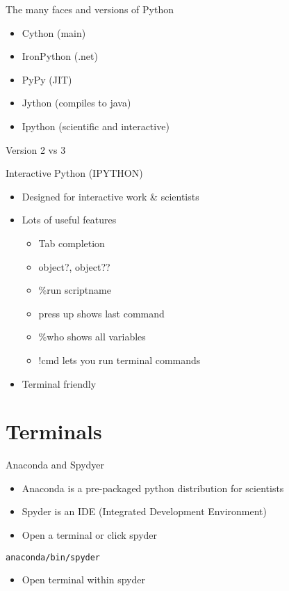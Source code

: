 \documentclass[presentation]{beamer}
\begin{document}
\begin{frame}[label=sec-2-0-5]{The many faces and versions of Python}
\begin{itemize}
\item Cython (main)
\item IronPython (.net)
\item PyPy (JIT)
\item Jython (compiles to java)
\item Ipython (scientific and interactive)
\end{itemize}
\end{frame}

\begin{frame}[label=sec-2-0-6]{Version 2 vs 3}
\end{frame}

\begin{frame}[label=sec-2-0-7]{Interactive Python (IPYTHON)}
\begin{itemize}
\item Designed for interactive work \& scientists
\item Lots of useful features
\begin{itemize}
\item Tab completion
\item object?, object??
\item \%run scriptname
\item press up shows last command
\item \%who shows all variables
\item !cmd lets you run terminal commands
\end{itemize}
\item Terminal friendly
\end{itemize}
\end{frame}


\section{Terminals}
\label{sec-3}

\begin{frame}[fragile,label=sec-3-0-1]{Anaconda and Spydyer}
 \begin{itemize}
\item Anaconda is a pre-packaged python distribution for scientists
\item Spyder is an IDE (Integrated Development Environment)
\item Open a terminal or click spyder
\end{itemize}

\lstset{numbers=left,language=sh,label= ,caption= }
\begin{lstlisting}
anaconda/bin/spyder
\end{lstlisting}

\begin{itemize}
\item Open terminal within spyder
\end{itemize}
\end{frame}
\end{document}

